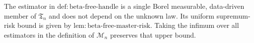 The estimator in \(\mathrm{def:beta\text{-}free\text{-}handle}\) is a single Borel measurable, data-driven member of \(\mathfrak T_n\) and does not depend on the unknown law. Its uniform supremum-risk bound is given by \(\mathrm{lem:beta\text{-}free\text{-}master\text{-}risk}\). Taking the infimum over all estimators in the definition of \(\mathcal M_n\) preserves that upper bound.